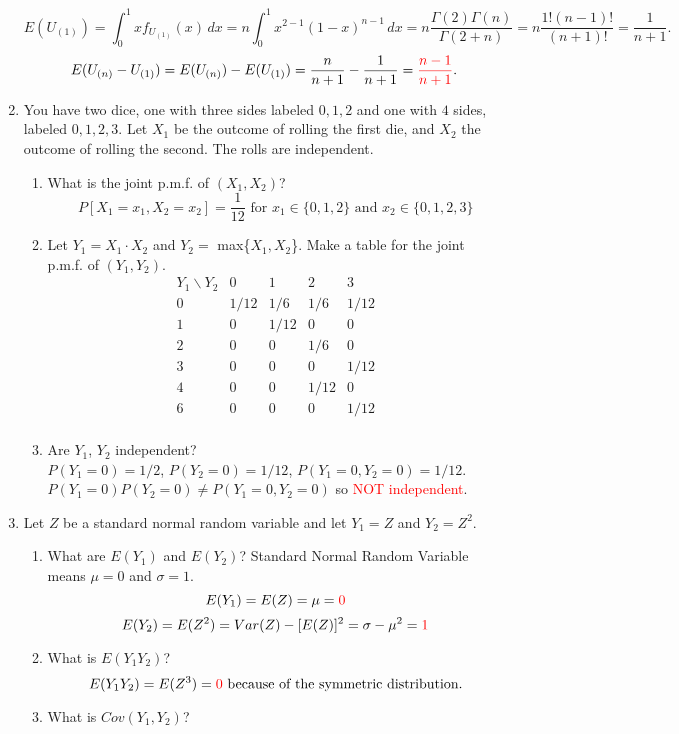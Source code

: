 \documentclass{article}
\begin{document}
\begin{enumerate}
\[
E(U_{(1)}) = \int_0^1 x f_{U_{(1)}}(x) \, dx = n \int_0^1 x^{2-1} (1 - x)^{n-1} \, dx = n\frac{\Gamma(2)\Gamma(n)}{\Gamma(2 + n)}=n\frac{1!(n-1)!}{(n+1)!}=\frac{1}{n+1}.
\]
\[
E(U_{(n)} - U_{(1)}) = E(U_{(n)}) - E(U_{(1)}) = \frac{n}{n+1} - \frac{1}{n+1} = \textcolor{red}{\frac{n-1}{n+1}}.
\]
\item You have two dice, one with three sides labeled $0, 1, 2$ and one with $4$ sides,
labeled $0, 1, 2, 3$. Let $X_1$ be the outcome of rolling the first die, and $X_2$ the outcome
of rolling the second. The rolls are independent.
\begin{enumerate}   
    \item What is the joint p.m.f. of $(X_1, X_2)$?
\[
P[X_1=x_1, X_2 = x_2] = \frac{1}{12}\text{ for } x_1 \in \{0,1,2\} \text{ and } x_2 \in \{0,1,2,3\}  
\]
    \item Let $Y_1 = X_1 \cdot X_2$ and $Y_2 =$ max\{$X_1, X_2$\}. Make a table for the joint p.m.f. of $(Y_1,Y_2)$.
\[
\begin{array}{c|c|c|c|c}
Y_1 \backslash Y_2 & 0 & 1 & 2 & 3 \\
\hline
0 & 1/12 & 1/6 & 1/6 & 1/12 \\
1 & 0 & 1/12 & 0 & 0 \\
2 & 0 & 0 & 1/6 & 0 \\
3 & 0 & 0 & 0 & 1/12 \\
4 & 0 & 0 & 1/12 & 0 \\
6 & 0 & 0 & 0 & 1/12 \\
\end{array}
\]
    \item Are $Y_1$, $Y_2$ independent?\\
$P(Y_1=0)=1/2$, $P(Y_2=0)=1/12$, $P(Y_1=0,Y_2=0)=1/12$.\\
$P(Y_1=0)P(Y_2=0)\neq P(Y_1=0,Y_2=0)$ so \textcolor{red}{NOT independent}.
\end{enumerate}
\pagebreak
\item Let $Z$ be a standard normal random variable and let $Y_1 = Z$ and $Y_2 = Z^2$.
\begin{enumerate}
    \item What are $E(Y_1)$ and $E(Y_2)$?
    Standard Normal Random Variable means $\mu = 0$ and $\sigma = 1$.
    \[
    E(Y_1)=E(Z)=\mu=\textcolor{red}{0}
    \]
    \[
    E(Y_2) = E(Z^2) = Var(Z)-[E(Z)]^2 = \sigma - \mu^2 = \textcolor{red}{1}
    \]
    \item What is $E(Y_1Y_2)$?
    \[
    E(Y_1Y_2)=E(Z^3)=\textcolor{red}{0} \text{ because of the symmetric distribution.}
    \]
    \item What is $Cov(Y_1,Y_2)$?

\end{enumerate}
\end{enumerate}
\end{document}
